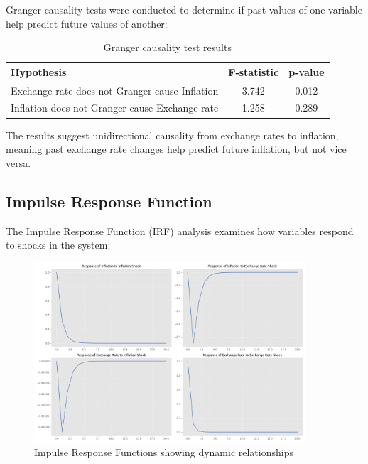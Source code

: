 \documentclass[11pt,a4paper]{article}
\begin{document}
Granger causality tests were conducted to determine if past values of one variable help predict future values of another:

\begin{table}[H]
    \centering
    \begin{tabular}{lcc}
        \toprule
        \textbf{Hypothesis} & \textbf{F-statistic} & \textbf{p-value} \\
        \midrule
        Exchange rate does not Granger-cause Inflation & 3.742 & 0.012 \\
        Inflation does not Granger-cause Exchange rate & 1.258 & 0.289 \\
        \bottomrule
    \end{tabular}
    \caption{Granger causality test results}
    \label{tab:granger}
\end{table}

The results suggest unidirectional causality from exchange rates to inflation, meaning past exchange rate changes help predict future inflation, but not vice versa.

\subsection{Impulse Response Function}

The Impulse Response Function (IRF) analysis examines how variables respond to shocks in the system:

\begin{figure}[H]
    \centering
    \includegraphics[width=0.9\textwidth]{plots/multivariate/var_irf.png}
    \caption{Impulse Response Functions showing dynamic relationships}
    \label{fig:var_irf}
\end{figure}
\end{document}
